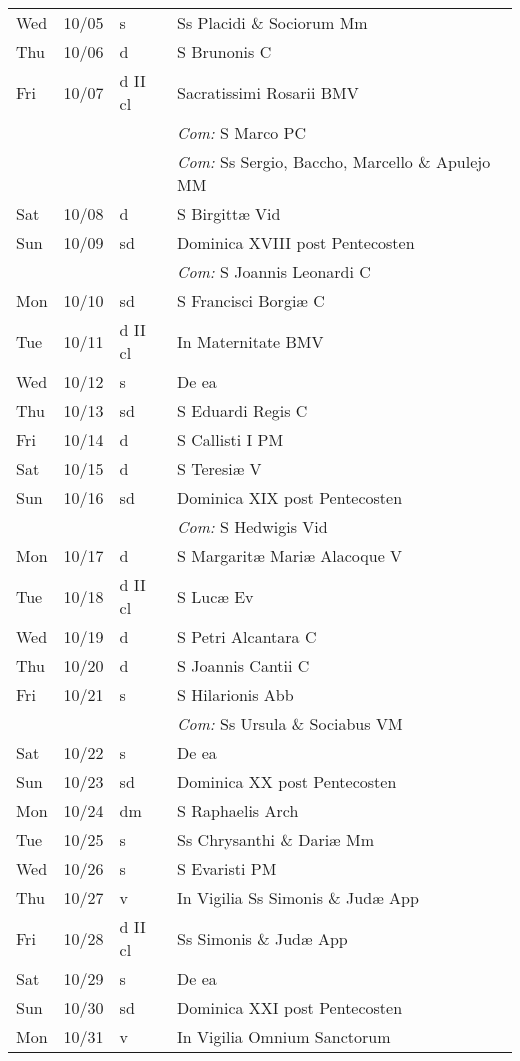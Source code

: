 \documentclass[10pt]{article}
\begin{document}
\begin{longtable}{ l l l l }
Wed & 10/05 & s & Ss Placidi \& Sociorum Mm\\
Thu & 10/06 & d & S Brunonis C\\
Fri & 10/07 & d II cl & Sacratissimi Rosarii BMV\\
 & & & \textit{Com:} S Marco PC\\
 & & & \textit{Com:} Ss Sergio, Baccho, Marcello \& Apulejo MM\\
Sat & 10/08 & d & S Birgittæ Vid\\
Sun & 10/09 & sd & Dominica XVIII post Pentecosten\\
 & & & \textit{Com:} S Joannis Leonardi C\\
Mon & 10/10 & sd & S Francisci Borgiæ C\\
Tue & 10/11 & d II cl & In Maternitate BMV\\
Wed & 10/12 & s & De ea\\
Thu & 10/13 & sd & S Eduardi Regis C\\
Fri & 10/14 & d & S Callisti I PM\\
Sat & 10/15 & d & S Teresiæ V\\
Sun & 10/16 & sd & Dominica XIX post Pentecosten\\
 & & & \textit{Com:} S Hedwigis Vid\\
Mon & 10/17 & d & S Margaritæ Mariæ Alacoque V\\
Tue & 10/18 & d II cl & S Lucæ Ev\\
Wed & 10/19 & d & S Petri Alcantara C\\
Thu & 10/20 & d & S Joannis Cantii C\\
Fri & 10/21 & s & S Hilarionis Abb\\
 & & & \textit{Com:} Ss Ursula \& Sociabus VM\\
Sat & 10/22 & s & De ea\\
Sun & 10/23 & sd & Dominica XX post Pentecosten\\
Mon & 10/24 & dm & S Raphaelis Arch\\
Tue & 10/25 & s & Ss Chrysanthi \& Dariæ Mm\\
Wed & 10/26 & s & S Evaristi PM\\
Thu & 10/27 & v & In Vigilia Ss Simonis \& Judæ App\\
Fri & 10/28 & d II cl & Ss Simonis \& Judæ App\\
Sat & 10/29 & s & De ea\\
Sun & 10/30 & sd & Dominica XXI post Pentecosten\\
Mon & 10/31 & v & In Vigilia Omnium Sanctorum\\

\end{longtable}
\end{document}
